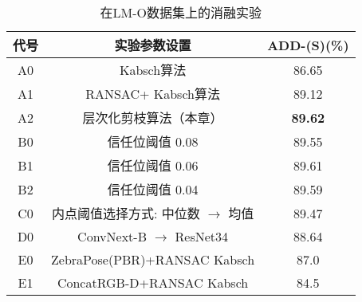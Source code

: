 \begin{table}[htbp]
  \centering
  \caption{在LM-O数据集上的消融实验}
  \label{tab:hipose_ablation_study}
  \begin{tabular}{@{}c|c|c@{}}
    \toprule
    代号 & 实验参数设置 & ADD-(S)(\%) \\
     \midrule
     A0 &Kabsch算法& 86.65 \\
     A1 &RANSAC+ Kabsch算法& 89.12 \\
     A2 &层次化剪枝算法（本章） &\textbf{89.62}\\
     \midrule
     B0 &信任位阈值 0.08& 89.55 \\
     B1 &信任位阈值 0.06& 89.61 \\
     B2 &信任位阈值 0.04& 89.59 \\
     \midrule
     C0 &内点阈值选择方式: 中位数 $\rightarrow$ 均值 & 89.47 \\
     \midrule
     D0 & ConvNext-B\cite{Liu2022ACF} $\rightarrow$ ResNet34\cite{He2015DeepRL} & 88.64 \\
     \midrule
     E0 & ZebraPose(PBR)+RANSAC Kabsch&87.0\\
     E1 & ConcatRGB-D+RANSAC Kabsch&84.5\\
    \bottomrule
  \end{tabular}
\end{table}